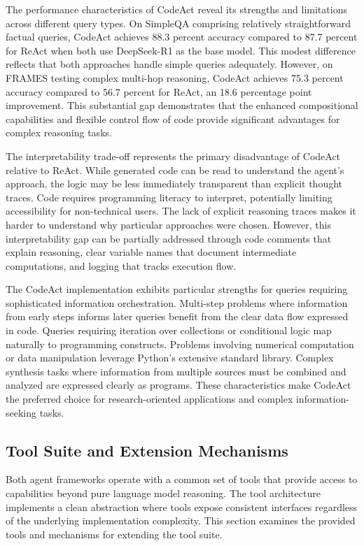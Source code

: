 The performance characteristics of CodeAct reveal its strengths and limitations across different query types. On SimpleQA comprising relatively straightforward factual queries, CodeAct achieves 88.3 percent accuracy compared to 87.7 percent for ReAct when both use DeepSeek-R1 as the base model. This modest difference reflects that both approaches handle simple queries adequately. However, on FRAMES testing complex multi-hop reasoning, CodeAct achieves 75.3 percent accuracy compared to 56.7 percent for ReAct, an 18.6 percentage point improvement. This substantial gap demonstrates that the enhanced compositional capabilities and flexible control flow of code provide significant advantages for complex reasoning tasks.

The interpretability trade-off represents the primary disadvantage of CodeAct relative to ReAct. While generated code can be read to understand the agent's approach, the logic may be less immediately transparent than explicit thought traces. Code requires programming literacy to interpret, potentially limiting accessibility for non-technical users. The lack of explicit reasoning traces makes it harder to understand why particular approaches were chosen. However, this interpretability gap can be partially addressed through code comments that explain reasoning, clear variable names that document intermediate computations, and logging that tracks execution flow.

The CodeAct implementation exhibits particular strengths for queries requiring sophisticated information orchestration. Multi-step problems where information from early steps informs later queries benefit from the clear data flow expressed in code. Queries requiring iteration over collections or conditional logic map naturally to programming constructs. Problems involving numerical computation or data manipulation leverage Python's extensive standard library. Complex synthesis tasks where information from multiple sources must be combined and analyzed are expressed clearly as programs. These characteristics make CodeAct the preferred choice for research-oriented applications and complex information-seeking tasks.

\subsection{Tool Suite and Extension Mechanisms}

Both agent frameworks operate with a common set of tools that provide access to capabilities beyond pure language model reasoning. The tool architecture implements a clean abstraction where tools expose consistent interfaces regardless of the underlying implementation complexity. This section examines the provided tools and mechanisms for extending the tool suite.

